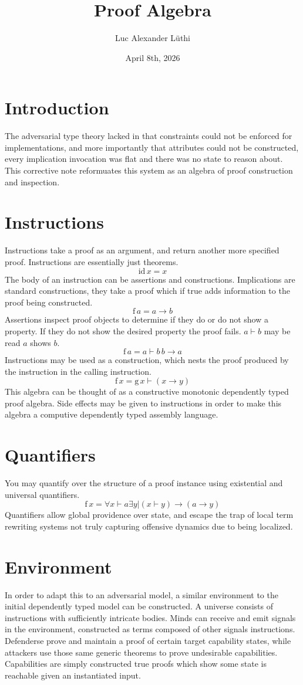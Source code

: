 \documentclass{article}
\title{Proof Algebra}
\author{Luc Alexander L{\"u}thi}
\date{April 8th, 2026}
\begin{document}
	\maketitle
	\tableofcontents
	\section{Introduction}
	The adversarial type theory lacked in that constraints could not be enforced for implementations, and more importantly that attributes could not be constructed, every implication invocation was flat and there was no state to reason about. This corrective note reformuates this system as an algebra of proof construction and inspection.
	\section{Instructions}
	Instructions take a proof as an argument, and return another more specified proof. Instructions are essentially just theorems.
	$$\text{id}\,x = x$$
	The body of an instruction can be assertions and constructions. Implications are standard constructions, they take a proof which if true adds information to the proof being constructed.
	$$\text{f}\,a = a \rightarrow b$$
	Assertions inspect proof objects to determine if they do or do not show a property. If they do not show the desired property the proof fails. $a \vdash b$ may be read $a$ shows $b$.
	$$\text{f}\,a = a \vdash b\,b \rightarrow a$$
	Instructions may be used as a construction, which nests the proof produced by the instruction in the calling instruction.
	$$\text{f}\,x = \text{g}\,x \vdash (x \rightarrow y)$$
	This algebra can be thought of as a constructive monotonic dependently typed proof algebra. Side effects may be given to instructions in order to make this algebra a computive dependently typed assembly language. 
	\section{Quantifiers}
	You may quantify over the structure of a proof instance using existential and universal quantifiers.
	$$\text{f}\,x = \forall x \vdash a \exists y | (x \vdash y) \rightarrow (a \rightarrow y)$$
	Quantifiers allow global providence over state, and escape the trap of local term rewriting systems not truly capturing offensive dynamics due to being localized. 
	\section{Environment}
	In order to adapt this to an adversarial model, a similar environment to the initial dependently typed model can be constructed. A universe consists of instructions with sufficiently intricate bodies. Minds can receive and emit signals in the environment, constructed as terms composed of other signals instructions. Defenderse prove and maintain a proof of certain target capability states, while attackers use those same generic theorems to prove undesirable capabilities. Capabilities are simply constructed true proofs which show some state is reachable given an instantiated input. 
\end{document}
